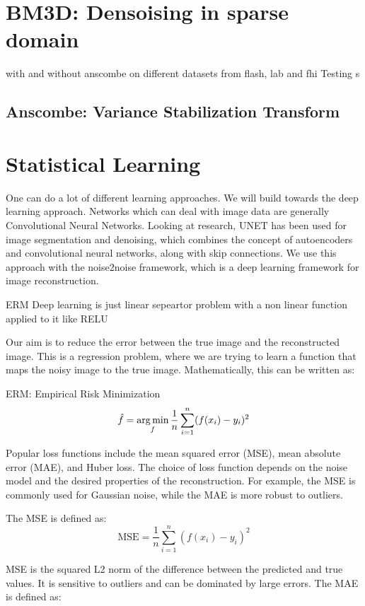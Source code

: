 \section{BM3D: Densoising in sparse domain}
with and without anscombe on different datasets from flash, lab and fhi
Testing s
\subsection{Anscombe: Variance Stabilization Transform}

\section{Statistical Learning}
One can do a lot of different learning approaches. We will build towards the deep learning approach. Networks which can deal with image data are generally Convolutional Neural Networks. Looking at research, UNET has been used for image segmentation and denoising, which combines the concept of autoencoders and convolutional neural networks, along with skip connections.
We use this approach with the noise2noise framework, which is a deep learning framework for image reconstruction.

ERM 
Deep learning is just linear sepeartor problem with a non linear function applied to it like RELU

Our aim is to reduce the error between the true image and the reconstructed image. This is a regression problem, where we are trying to learn a function that maps the noisy image to the true image. Mathematically, this can be written as:

ERM: Empirical Risk Minimization
\begin{equation}
    \hat{f} = \operatorname*{arg\,min}_f \frac{1}{n} \sum_{i=1}^{n} (f(x_i) - y_i)^{2}
\end{equation}

Popular loss functions include the mean squared error (MSE), mean absolute error (MAE), and Huber loss. The choice of loss function depends on the noise model and the desired properties of the reconstruction. For example, the MSE is commonly used for Gaussian noise, while the MAE is more robust to outliers.

The MSE is defined as:
\begin{equation}
    \text{MSE} = \frac{1}{n} \sum_{i=1}^{n} (f(x_i) - y_i)^{2}
\end{equation}

MSE is the squared L2 norm of the difference between the predicted and true values. It is sensitive to outliers and can be dominated by large errors. The MAE is defined as:

